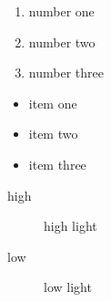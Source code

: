 \documentclass{article}
\begin{document}
  \begin{enumerate}
	\itemsep=0pt
	\parskip=0pt
    \item number one
    \item number two
    \item number three
  \end{enumerate}
  \begin{itemize}
	\itemsep=0pt
	\parskip=0pt
	\item item one
	\item item two
	\item item three
  \end{itemize}
  \begin{description}
    \item[high] high light
    \item[low] low light
  \end{description}
\end{document}

